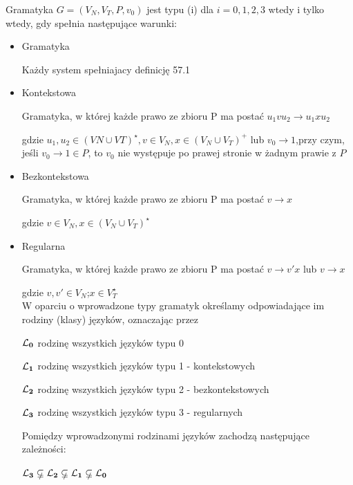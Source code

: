 \documentclass[12pt]{article}
\begin{document}
    \begin{definition}
        Gramatyka $G=(V_N,V_T,P,v_0)$ jest typu (i) dla $i=0,1,2,3$ wtedy i tylko wtedy, gdy spełnia następujące warunki:

        \begin{itemize}
            \item Gramatyka

            Każdy system spełniajacy definicję 57.1
            \item Kontekstowa

            Gramatyka, w której każde prawo ze zbioru P ma postać $u_1vu_2 \rightarrow u_1xu_2$

            gdzie $u_1,u_2 \in (VN \cup VT)^\star,v \in V_N,x \in (V_N \cup V_T)^+$ lub $v_0 \rightarrow 1$,przy czym, jeśli $v_0 \rightarrow 1 \in P$, to $v_0$ nie występuje po prawej stronie w żadnym prawie z $P$

            \item Bezkontekstowa

            Gramatyka, w której każde prawo ze zbioru P ma postać
            $v \rightarrow x$

            gdzie $v \in V_N, x \in (V_N \cup V_T)^\star$

            \item Regularna

            Gramatyka, w której każde prawo ze zbioru P ma postać
            $v \rightarrow v'x$ lub $v \rightarrow x$

            gdzie $v,v' \in V_N$;$x \in V_T^\star$
            \\


            W oparciu o wprowadzone typy gramatyk określamy odpowiadające im rodziny (klasy) języków, oznaczając przez

            $\bf \mathcal{L}_{0}$ rodzinę wszystkich języków typu 0

            $\bf \mathcal{L}_{1}$ rodzinę wszystkich języków typu 1 - kontekstowych

            $\bf \mathcal{L}_{2}$ rodzinę wszystkich języków typu 2 - bezkontekstowych

            $\bf \mathcal{L}_{3}$ rodzinę wszystkich języków typu 3 - regularnych

            Pomiędzy wprowadzonymi rodzinami języków zachodzą następujące zależności:

            $\bf \mathcal{L}_{3}\subseteq \! \! \! \! \! _{/\; \, }\bf \mathcal{L}_{2}\subseteq \! \! \! \! \! _{/\; \, }\bf \mathcal{L}_{1}\subseteq \! \! \! \! \! _{/\; \, }\bf \mathcal{L}_{0}$

        \end{itemize}

    \end{definition}
\end{document}

